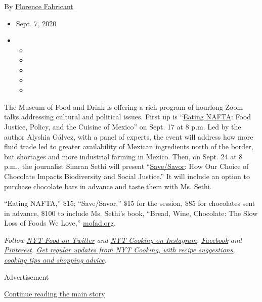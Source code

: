 By
\href{https://www.nytimes3xbfgragh.onion/by/florence-fabricant}{Florence
Fabricant}

\begin{itemize}
\item
  Sept. 7, 2020
\item
  \begin{itemize}
  \item
  \item
  \item
  \item
  \item
  \end{itemize}
\end{itemize}

The Museum of Food and Drink is offering a rich program of hourlong Zoom
talks addressing cultural and political issues. First up is
``\href{https://www.mofad.org/events/2020/917/eatingnafta}{Eating
NAFTA}: Food Justice, Policy, and the Cuisine of Mexico'' on Sept. 17 at
8 p.m. Led by the author Alyshia Gálvez, with a panel of experts, the
event will address how more fluid trade led to greater availability of
Mexican ingredients north of the border, but shortages and more
industrial farming in Mexico. Then, on Sept. 24 at 8 p.m., the
journalist Simran Sethi will present
``\href{https://www.mofad.org/events/2020/0820/save/savor}{Save/Savor}:
How Our Choice of Chocolate Impacts Biodiversity and Social Justice.''
It will include an option to purchase chocolate bars in advance and
taste them with Ms. Sethi.

``Eating NAFTA,'' \$15; ``Save/Savor,'' \$15 for the session, \$85 for
chocolates sent in advance, \$100 to include Ms. Sethi's book, ``Bread,
Wine, Chocolate: The Slow Loss of Foods We Love,''
\href{https://www.mofad.org/events?view=calendar\&month=09-2020}{mofad.org}.

\emph{Follow} \href{https://twitter.com/nytfood}{\emph{NYT Food on
Twitter}} \emph{and}
\href{https://www.instagram.com/nytcooking/}{\emph{NYT Cooking on
Instagram}}\emph{,}
\href{https://www.facebookcorewwwi.onion/nytcooking/}{\emph{Facebook}}
\emph{and}
\href{https://www.pinterest.com/nytcooking/}{\emph{Pinterest}}\emph{.}
\href{https://www.nytimes3xbfgragh.onion/newsletters/cooking}{\emph{Get
regular updates from NYT Cooking, with recipe suggestions, cooking tips
and shopping advice}}\emph{.}

Advertisement

\protect\hyperlink{after-bottom}{Continue reading the main story}

